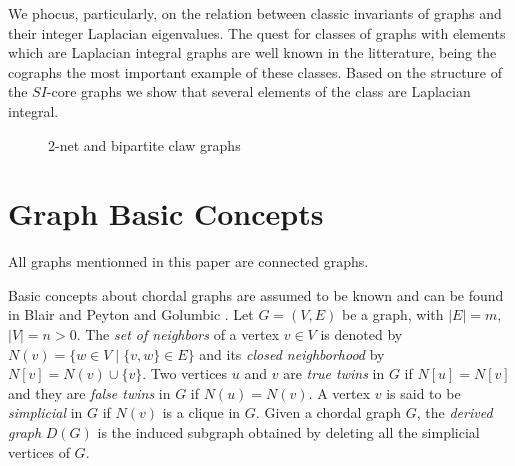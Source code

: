 \documentclass[preprint,12pt]{elsarticle}
\begin{document}
We phocus, particularly, on the relation between classic invariants of graphs and 
their integer Laplacian eigenvalues.
The quest for classes of graphs with elements
which are Laplacian integral graphs are well known in the litterature, being 
the cographs the most important example of these classes.
Based on the structure of the $SI$-core graphs we show that several 
elements of the class are  Laplacian integral.

\begin{figure}[h]
\begin{center}
\caption{2-net and bipartite claw graphs}
  \label{fig:forbidden}
\end{center}
\end{figure}





\section{Graph Basic Concepts}

All graphs mentionned in this paper are connected graphs.

Basic concepts about chordal graphs are assumed to be known and
can be found in Blair and Peyton \cite{BP93} and Golumbic \cite{Go04}.
Let $G = (V, E)$ be a graph, with $|E|=m$,  $|V| = n > 0$.
The \textit{set of neighbors\/} of a vertex $v \in V$ is denoted by
$N(v) = \{ w \in V \mid \{v,w\} \in E\}$ and its \textit{closed neighborhood} by  $N[v] = N(v)\cup \{v\} $.
Two vertices $u$ and $v$   are  \textit{true twins} in $G$  if $N[u] = N [v]$ and 
they are \textit{false twins}  in $G$  if $N (u) = N(v)$.
A vertex $v$ is said to be \textit{simplicial\/} in $G$ if $N(v)$  is a
clique in $G$.
Given a chordal graph $G$, the \textit{derived graph} $D(G)$ 
is the induced subgraph obtained by deleting all 
the simplicial vertices of $G$.
\end{document}
